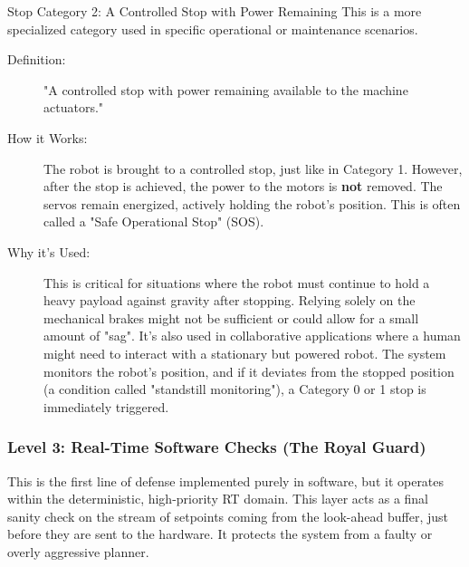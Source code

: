 \begin{tipbox}{Stop Category 2: A Controlled Stop with Power Remaining}
    This is a more specialized category used in specific operational or maintenance scenarios.
    \begin{description}
        \item[Definition:] "A controlled stop with power remaining available to the machine actuators."
        \item[How it Works:] The robot is brought to a controlled stop, just like in Category 1. However, after the stop is achieved, the power to the motors is \textbf{not} removed. The servos remain energized, actively holding the robot's position. This is often called a "Safe Operational Stop" (SOS).
        \item[Why it's Used:] This is critical for situations where the robot must continue to hold a heavy payload against gravity after stopping. Relying solely on the mechanical brakes might not be sufficient or could allow for a small amount of "sag". It's also used in collaborative applications where a human might need to interact with a stationary but powered robot. The system monitors the robot's position, and if it deviates from the stopped position (a condition called "standstill monitoring"), a Category 0 or 1 stop is immediately triggered.
    \end{description}
\end{tipbox}



\subsubsection{Level 3: Real-Time Software Checks (The Royal Guard)}
\label{subsubsec:level3_rt_checks}

This is the first line of defense implemented purely in software, but it operates within the deterministic, high-priority RT domain. This layer acts as a final sanity check on the stream of setpoints coming from the look-ahead buffer, just before they are sent to the hardware. It protects the system from a faulty or overly aggressive planner.

